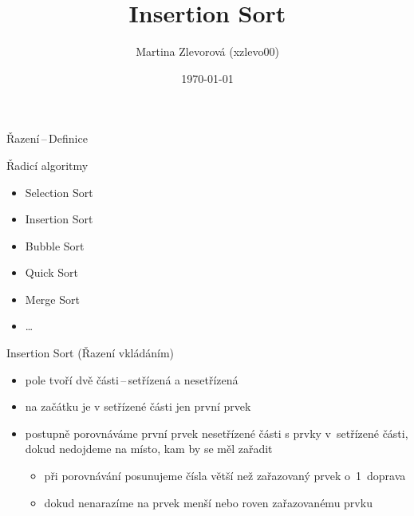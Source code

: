 \documentclass{beamer}
\title{Insertion Sort}
\author[Zlevorová]{Martina Zlevorová (xzlevo00)}
\institute[VUT FIT]{Fakulta informačních technologií\\
Vysoké učení technické v Brně}
\date{\today}
\begin{document}
\frame{\titlepage}
\begin{frame}{Řazení\,--\,Definice}
\cite{wiki}
\end{frame}
\begin{frame}{Řadicí algoritmy}
\begin{itemize}
\item Selection Sort
\item Insertion Sort
\item Bubble Sort
\item Quick Sort
\item Merge Sort
\item \dots
\end{itemize}
\end{frame}
\begin{frame}{Insertion Sort (Řazení vkládáním)}
\begin{itemize}
\pause
\item pole tvoří dvě části\,--\,setřízená a nesetřízená
\pause
\item na začátku je v setřízené části jen první prvek
\pause
\item postupně porovnáváme první prvek nesetřízené části s prvky v~setřízené části, dokud nedojdeme na místo, kam by se měl zařadit
\pause
\begin{itemize}
\item při porovnávání posunujeme čísla větší než zařazovaný prvek o~1~doprava
\pause
\item dokud nenarazíme na prvek menší nebo roven zařazovanému prvku
\end{itemize}
\end{itemize}
\end{frame}
\end{document}
